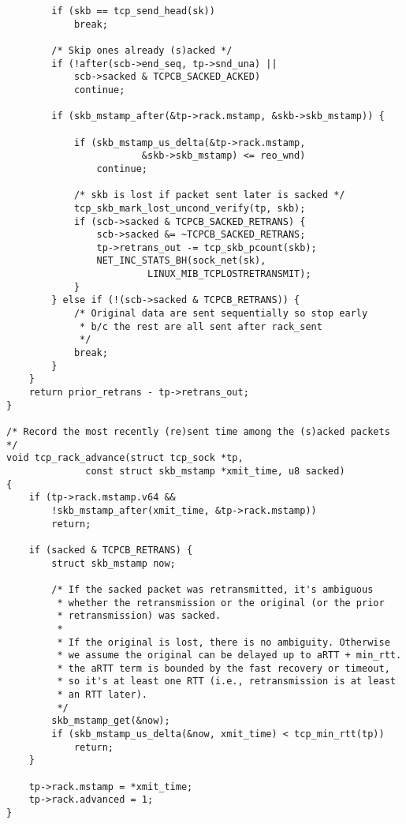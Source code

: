 \begin{verbatim}
        if (skb == tcp_send_head(sk))
            break;

        /* Skip ones already (s)acked */
        if (!after(scb->end_seq, tp->snd_una) ||
            scb->sacked & TCPCB_SACKED_ACKED)
            continue;

        if (skb_mstamp_after(&tp->rack.mstamp, &skb->skb_mstamp)) {

            if (skb_mstamp_us_delta(&tp->rack.mstamp,
                        &skb->skb_mstamp) <= reo_wnd)
                continue;

            /* skb is lost if packet sent later is sacked */
            tcp_skb_mark_lost_uncond_verify(tp, skb);
            if (scb->sacked & TCPCB_SACKED_RETRANS) {
                scb->sacked &= ~TCPCB_SACKED_RETRANS;
                tp->retrans_out -= tcp_skb_pcount(skb);
                NET_INC_STATS_BH(sock_net(sk),
                         LINUX_MIB_TCPLOSTRETRANSMIT);
            }
        } else if (!(scb->sacked & TCPCB_RETRANS)) {
            /* Original data are sent sequentially so stop early
             * b/c the rest are all sent after rack_sent
             */
            break;
        }
    }
    return prior_retrans - tp->retrans_out;
}

/* Record the most recently (re)sent time among the (s)acked packets */
void tcp_rack_advance(struct tcp_sock *tp,
              const struct skb_mstamp *xmit_time, u8 sacked)
{
    if (tp->rack.mstamp.v64 &&
        !skb_mstamp_after(xmit_time, &tp->rack.mstamp))
        return;

    if (sacked & TCPCB_RETRANS) {
        struct skb_mstamp now;

        /* If the sacked packet was retransmitted, it's ambiguous
         * whether the retransmission or the original (or the prior
         * retransmission) was sacked.
         *
         * If the original is lost, there is no ambiguity. Otherwise
         * we assume the original can be delayed up to aRTT + min_rtt.
         * the aRTT term is bounded by the fast recovery or timeout,
         * so it's at least one RTT (i.e., retransmission is at least
         * an RTT later).
         */
        skb_mstamp_get(&now);
        if (skb_mstamp_us_delta(&now, xmit_time) < tcp_min_rtt(tp))
            return;
    }

    tp->rack.mstamp = *xmit_time;
    tp->rack.advanced = 1;
}
\end{verbatim}
